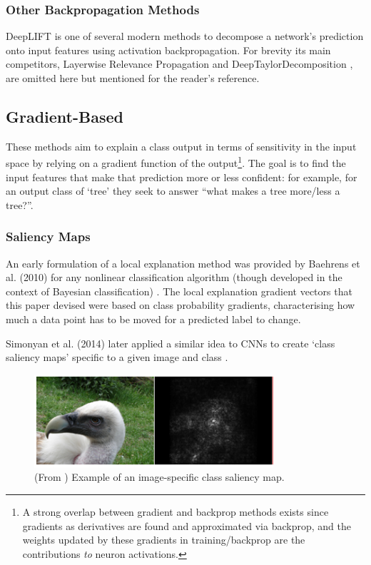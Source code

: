 \documentclass[main]{subfiles}
\begin{document}
\subsubsection{Other Backpropagation Methods}
DeepLIFT is one of several modern methods to decompose a network's prediction onto input features using activation backpropagation. For brevity its main competitors, Layerwise Relevance Propagation \cite{lrp} and DeepTaylorDecomposition \cite{taylor}, are omitted here but mentioned for the reader's reference.


\subsection{Gradient-Based} \label{sec:gradient}
These methods aim to explain a class output in terms of sensitivity in the input space by relying on a gradient function of the output\footnote{A strong overlap between gradient and backprop methods exists since gradients as derivatives are found and approximated via backprop, and the weights updated by these gradients in training/backprop are the contributions \textit{to} neuron activations.}. The goal is to find the input features that make that prediction more or less confident: for example, for an output class of `tree' they seek to answer ``what makes a tree more/less a tree?''.

\subsubsection{Saliency Maps}
An early formulation of a local explanation method was provided by Baehrens et al. (2010) for any nonlinear classification algorithm (though developed in the context of Bayesian classification) \cite{saliencyI}. The local explanation gradient vectors that this paper devised were based on class probability gradients, characterising how much a data point has to be moved for a predicted label to change.

Simonyan et al. (2014) later applied a similar idea to CNNs to create `class saliency maps' specific to a given image and class \cite{saliencyII}. 

\begin{figure}[h]
\centering
\includegraphics[scale=0.8]{saliency.png}
\caption{(From \cite{saliencyII}) Example of an image-specific class saliency map.}
\label{saliencyimg}
\end{figure}
\end{document}
